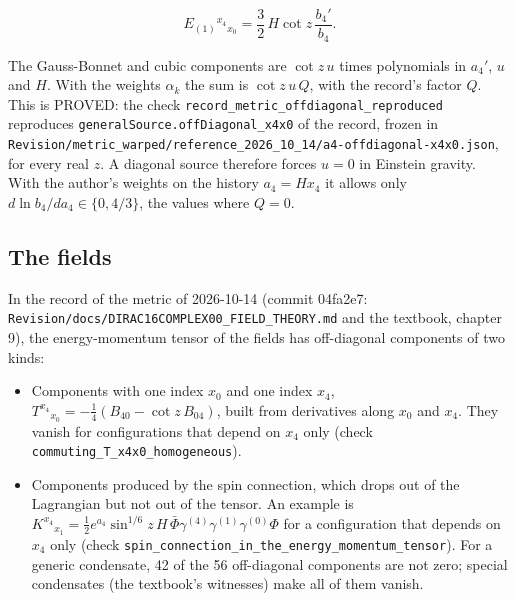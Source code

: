 \documentclass[11pt]{article}
\begin{document}
\[
E_{(1)}{}^{x_4}{}_{x_0} = \frac32\,H\cot z\,\frac{b_4'}{b_4} .
\]

The Gauss-Bonnet and cubic components are $\cot z\,u$ times polynomials in $a_4'$, $u$ and $H$. With the weights $\alpha_k$ the sum is $\cot z\,u\,Q$, with the record's factor $Q$. This is PROVED: the check \texttt{record\_m\allowbreak{}etric\_of\allowbreak{}fdiagona\allowbreak{}l\_reprod\allowbreak{}uced} reproduces \texttt{generalS\allowbreak{}ource.of\allowbreak{}fDiagona\allowbreak{}l\_x4x0} of the record, frozen in \texttt{Revision\allowbreak{}/metric\_\allowbreak{}warped/r\allowbreak{}eference\allowbreak{}\_2026\_10\allowbreak{}\_14/a4-o\allowbreak{}ffdiagon\allowbreak{}al-x4x0.\allowbreak{}json}, for every real $z$. A diagonal source therefore forces $u = 0$ in Einstein gravity. With the author's weights on the history $a_4 = Hx_4$ it allows only $d\ln b_4/da_4 \in \{0, 4/3\}$, the values where $Q = 0$.

\subsection{The fields}

In the record of the metric of 2026-10-14 (commit 04fa2e7: \texttt{Revision\allowbreak{}/docs/DI\allowbreak{}RAC16COM\allowbreak{}PLEX00\_F\allowbreak{}IELD\_THE\allowbreak{}ORY.md} and the textbook, chapter 9), the energy-momentum tensor of the fields has off-diagonal components of two kinds:

\begin{itemize}
\item Components with one index $x_0$ and one index $x_4$, $T^{x_4}{}_{x_0} = -\frac14(B_{40} - \cot z\,B_{04})$, built from derivatives along $x_0$ and $x_4$. They vanish for configurations that depend on $x_4$ only (check \texttt{commutin\allowbreak{}g\_T\_x4x0\allowbreak{}\_homogen\allowbreak{}eous}).
\item Components produced by the spin connection, which drops out of the Lagrangian but not out of the tensor. An example is $K^{x_4}{}_{x_1} = \frac12 e^{a_4}\sin^{1/6}z\,H\,\bar\Phi\gamma^{(4)}\gamma^{(1)}\gamma^{(0)}\Phi$ for a configuration that depends on $x_4$ only (check \texttt{spin\_con\allowbreak{}nection\_\allowbreak{}in\_the\_e\allowbreak{}nergy\_mo\allowbreak{}mentum\_t\allowbreak{}ensor}). For a generic condensate, 42 of the 56 off-diagonal components are not zero; special condensates (the textbook's witnesses) make all of them vanish.
\end{itemize}
\end{document}
